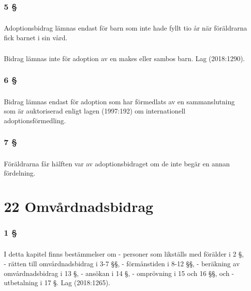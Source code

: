 \documentclass[a4paper,notitlepage,openany,10pt]{book}
\begin{document}
\subsection*{5 §}
\paragraph*{}
Adoptionsbidrag lämnas endast för barn som inte hade fyllt tio år när föräldrarna fick barnet i sin vård.
\paragraph*{}
Bidrag lämnas inte för adoption av en makes eller sambos barn.
Lag (2018:1290).
\subsection*{6 §}
\paragraph*{}
Bidrag lämnas endast för adoption som har förmedlats av en sammanslutning som är auktoriserad enligt lagen (1997:192) om internationell adoptionsförmedling.
\subsection*{7 §}
\paragraph*{}
Föräldrarna får hälften var av adoptionsbidraget om de inte begär en annan fördelning.
\chapter*{22 Omvårdnadsbidrag}
\subsection*{1 §}
\paragraph*{}
I detta kapitel finns bestämmelser om
\newline - personer som likställs med förälder i 2 §,
\newline - rätten till omvårdnadsbidrag i 3-7 §§,
\newline - förmånstiden i 8-12 §§,
\newline - beräkning av omvårdnadsbidrag i 13 §,
\newline - ansökan i 14 §,
\newline - omprövning i 15 och 16 §§, och
\newline - utbetalning i 17 §.
Lag (2018:1265).
\end{document}
